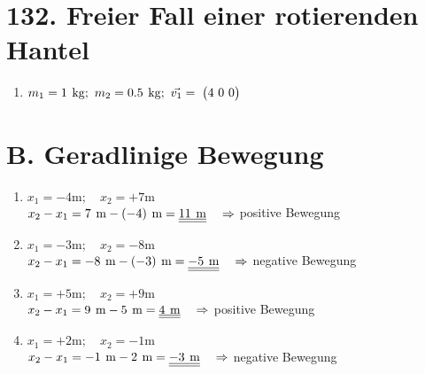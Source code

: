 \documentclass{alex_hü}
\begin{document}
\renewcommand{\labelenumi}{\arabic{enumi}.}


\section*{132. Freier Fall einer rotierenden Hantel}
\begin{enumerate}
	\item \(m_1 = 1 \si{kg};\ m_2 = 0.5 \si{kg};\ \vec{v_1} = \vector{4\ 0\ 0}   \)	
	
\end{enumerate}

\section*{B. Geradlinige Bewegung}
\begin{enumerate}
	\item $ x_1 = -4 \si{\m}; \quad x_2 = +7 \si{\m} $\\[1.5ex]
	$ x_2 - x_1 = 7 \si{\m} - (-4) \si{\m} = \dl{11 \si{\m}}\quad \Rightarrow$ positive Bewegung\\ 
	\item $ x_1 = -3 \si{\m}; \quad x_2 = -8 \si{\m} $\\[1.5ex]
	$ x_2 - x_1 = -8 \si{\m} - (-3) \si{\m} = \dl{-5 \si{\m}}\quad \Rightarrow$ negative Bewegung\\
	\item $ x_1 = +5 \si{\m}; \quad x_2 = +9 \si{\m} $\\[1.5ex]
	$ x_2 -x_1 = 9 \si{\m} - 5 \si{\m} = \dl{4 \si{\m}}\quad \Rightarrow$ positive Bewegung\\
	\item $ x_1 = +2 \si{\m}; \quad x_2 = -1 \si{\m}$\\[1.5ex]
	$ x_2 - x_1 = -1 \si{\m} - 2 \si{\m} = \dl{-3 \si{\m}}\quad \Rightarrow$ negative Bewegung
\end{enumerate}
\end{document}
